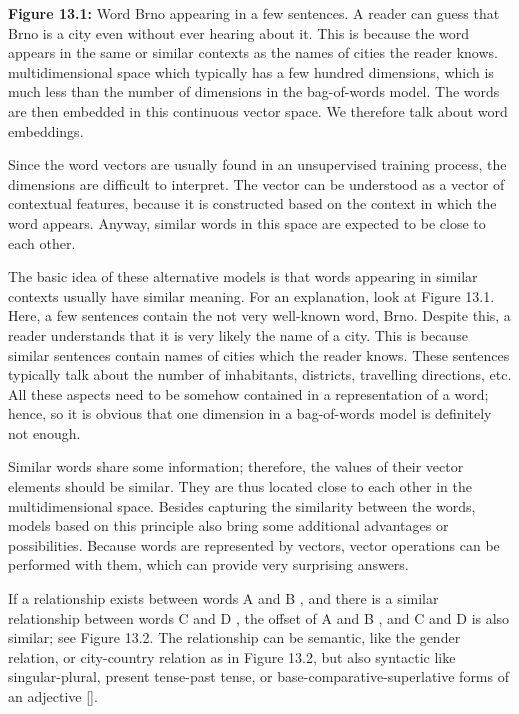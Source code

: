 \hspace{-1.5em}\textbf{Figure 13.1:} Word Brno appearing in a few sentences. A reader can guess that Brno is a city even without ever hearing about it. This is because the word appears in the same or similar contexts as the names of cities the reader knows.\\[1em]

\hspace{-1.5em}multidimensional space which typically has a few hundred dimensions, which is much less than the number of dimensions in the bag-of-words model. The words are then embedded in this continuous vector space. We therefore talk about word embeddings.

Since the word vectors are usually found in an unsupervised training process, the dimensions are difficult to interpret. The vector can be understood as a vector of contextual features, because it is constructed based on the context in which the word appears. Anyway, similar words in this space are expected to be close to each other.

The basic idea of these alternative models is that words appearing in similar contexts usually have similar meaning. For an explanation, look at Figure 13.1. Here, a few sentences contain the not very well-known word, Brno. Despite this, a reader understands that it is very likely the name of a city. This is because similar sentences contain names of cities which the reader knows. These sentences typically talk about the number of inhabitants, districts, travelling directions, etc. All these aspects need to be somehow contained in a representation of a word; hence, so it is obvious that one dimension in a bag-of-words model is definitely not enough.

Similar words share some information; therefore, the values of their vector elements should be similar. They are thus located close to each other in the multidimensional space. Besides capturing the similarity between the words, models based on this principle also bring some additional advantages or possibilities. Because words are represented by vectors, vector operations can be performed with them, which can provide very surprising answers.

If a relationship exists between words A and B , and there is a similar relationship between words C and D , the offset of A and B , and C and D is also similar; see Figure 13.2. The relationship can be semantic, like the gender relation, or city-country relation as in Figure 13.2, but also syntactic like singular-plural, present tense-past tense, or base-comparative-superlative forms of an adjective [\cite{ref195}].

